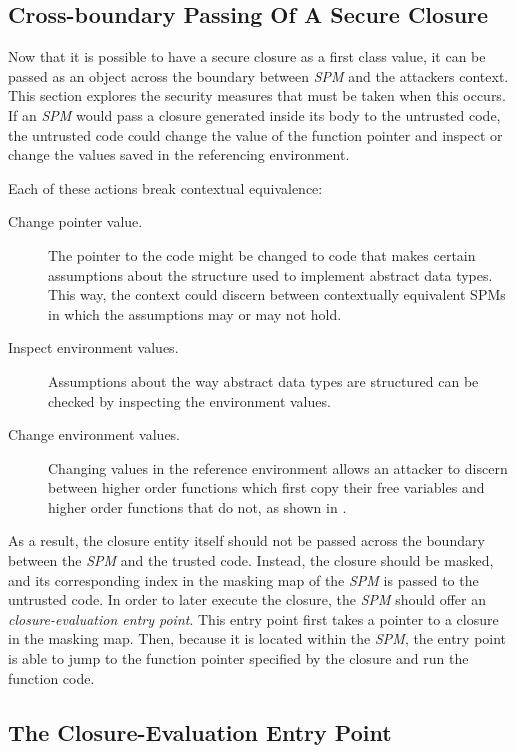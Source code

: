 \subsection{Cross-boundary Passing Of A Secure Closure }
Now that it is possible to have a secure closure as a first class value, it can be passed as an object across the boundary between \emph{SPM} and the attackers context.
This section explores the security measures that must be taken when this occurs.
If an \emph{SPM} would pass a closure generated inside its body to the untrusted code, the untrusted code could change the value of the function pointer and inspect or change the values saved in the referencing environment.

Each of these actions break contextual equivalence:
\begin{description}
\item[Change pointer value.] The pointer to the code might be changed to code that makes certain assumptions about the structure used to implement abstract data types.
This way, the context could discern between contextually equivalent SPMs in which the assumptions may or may not hold. 
\item[Inspect environment values.]
Assumptions about the way abstract data types are structured can be checked by inspecting the environment values. 
\item[Change environment values.] Changing values in the reference environment allows an attacker to discern between higher order functions which first copy their free variables and higher order functions that do not, as shown in .
\end{description}

As a result, the closure entity itself should not be passed across the boundary between the \emph{SPM} and the trusted code.
Instead, the closure should be masked, and its corresponding index in the masking map of the \emph{SPM} is passed to the untrusted code.
In order to later execute the closure, the \emph{SPM} should offer an \emph{closure-evaluation entry point}.
This entry point first takes a pointer to a closure in the masking map.
Then, because it is located within the \emph{SPM}, the entry point is able to jump to the function pointer specified by the closure and run the function code.

\subsection{The Closure-Evaluation Entry Point}

